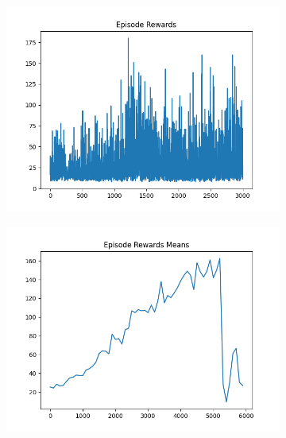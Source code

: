 \begin{figure}[H]
    \centering
    \begin{subfigure}{.47\linewidth}
        \centering
        \includegraphics[width=\textwidth]{pole/2024-06-13_19-16-11_dqn_cartpole_episode_rewards.png}
    \end{subfigure}
    \begin{subfigure}{.47\linewidth}
        \centering
        \includegraphics[width=\textwidth]{pole/2024-06-13_19-37-45_dqn_cartpole_episode_rewards_means.png}
    \end{subfigure}
    \begin{subfigure}{.47\linewidth}
        \centering

\end{subfigure}
\end{figure}
